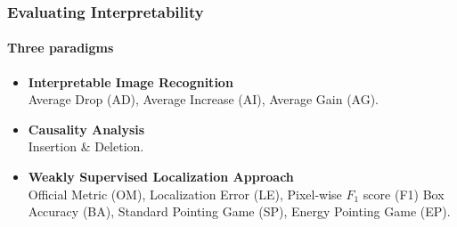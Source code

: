 \begin{frame}
    \frametitle{Evaluating Interpretability}
    \framesubtitle{Three paradigms}
    \small
    \pause
    \begin{itemize}
        \item\textbf{Interpretable Image Recognition\cite{chattopadhay2018grad}}\\
             Average Drop (AD), Average Increase (AI), Average Gain (AG).\pause
        \item\textbf{Causality Analysis\cite{petsiuk2018rise}}\\
             Insertion \& Deletion.\pause
        \item\textbf{Weakly Supervised Localization Approach}\\
            Official Metric (OM), Localization Error (LE), Pixel-wise $F_1$ score (F1)
            Box Accuracy (BA), Standard Pointing Game (SP), Energy Pointing Game (EP).
    \end{itemize}
\end{frame}
